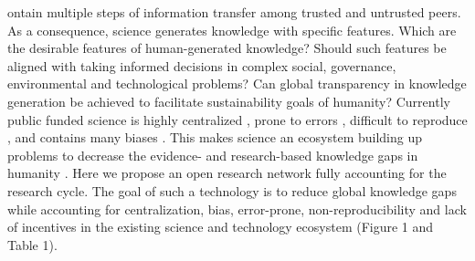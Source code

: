 \documentclass[12pt, a4paper]{article} %
\begin{document}
ontain multiple steps of information transfer
among trusted and untrusted peers. As a consequence, science generates
knowledge with specific features. Which are the desirable features of
human-generated knowledge? Should such features be aligned with taking
informed decisions in complex social, governance, environmental and
technological problems? Can global transparency in knowledge
generation be achieved to facilitate sustainability goals of humanity?
Currently public funded science is highly centralized
\citep{Inhaber1977,Gunther2018}⁠⁠, prone to errors \citep{Fang2011},
difficult to reproduce \citep{Hardwicke2018}, and contains many biases
\citep{Ioannidis2005}. This makes science an ecosystem building up
problems to decrease the evidence- and research-based knowledge gaps
in humanity \citep{Mastrangelo2019}. Here we propose an open research
network fully accounting for the research cycle. The goal of such a
technology is to reduce global knowledge gaps while accounting for
centralization, bias, error-prone, non-reproducibility and lack of
incentives in the existing science and technology ecosystem (Figure 1
and Table 1).

\end{document}
